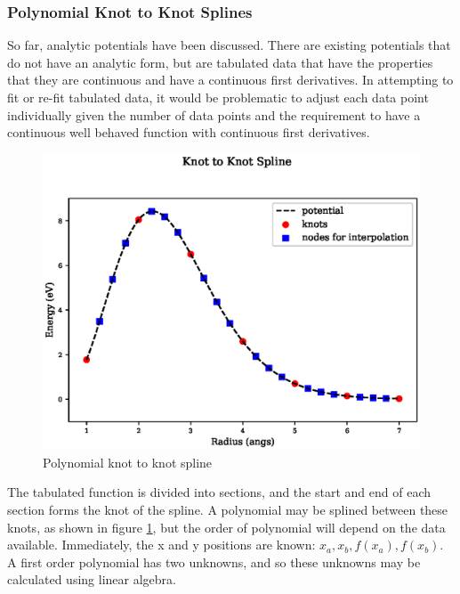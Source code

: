 \subsubsection{Polynomial Knot to Knot Splines}

So far, analytic potentials have been discussed.  There are existing potentials that do not have an analytic form, but are tabulated data that have the properties that they are continuous and have a continuous first derivatives.  In attempting to fit or re-fit tabulated data, it would be problematic to adjust each data point individually given the number of data points and the requirement to have a continuous well behaved function with continuous first derivatives.

\begin{figure}[h]
  \begin{center}
    \includegraphics[scale=0.70]{chapters/interatomic_potential_fitting/plots_spline/spline.eps}
    \caption{Polynomial knot to knot spline}
    \label{fig:polynomialknots}
  \end{center}
\end{figure}

The tabulated function is divided into sections, and the start and end of each section forms the knot of the spline.  A polynomial may be splined between these knots, as shown in figure \ref{fig:polynomialknots}, but the order of polynomial will depend on the data available.  Immediately, the x and y positions are known: $x_a, x_b, f(x_a), f(x_b)$.  A first order polynomial has two unknowns, and so these unknowns may be calculated using linear algebra.

